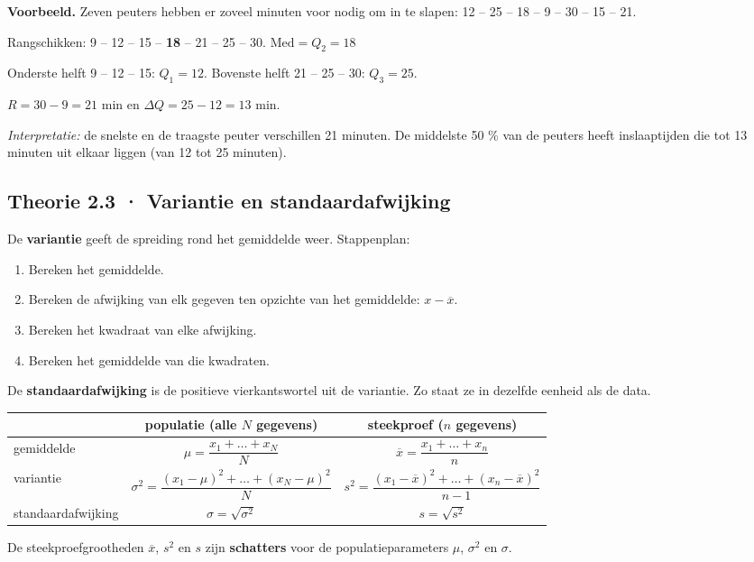 \begin{voorbeeld}
\textbf{Voorbeeld.} Zeven peuters hebben er zoveel minuten voor nodig om in te slapen: 12 – 25 – 18 – 9 – 30 – 15 – 21.

Rangschikken: 9 – 12 – 15 – \textbf{18} – 21 – 25 – 30. \quad $\text{Med}=Q_2=18$

Onderste helft 9 – 12 – 15: $Q_1=12$. \quad Bovenste helft 21 – 25 – 30: $Q_3=25$.

$R=30-9=21$ min \quad en \quad $\Delta Q=25-12=13$ min.

\emph{Interpretatie:} de snelste en de traagste peuter verschillen 21 minuten. De middelste 50 \% van de peuters heeft inslaaptijden die tot 13 minuten uit elkaar liggen (van 12 tot 25 minuten).
\end{voorbeeld}

\subsection*{Theorie 2.3 · Variantie en standaardafwijking}

\begin{theorie}
De \textbf{variantie} geeft de spreiding rond het gemiddelde weer. Stappenplan:

\begin{enumerate}
\item Bereken het gemiddelde.
\item Bereken de afwijking van elk gegeven ten opzichte van het gemiddelde: $x-\overline{x}$.
\item Bereken het kwadraat van elke afwijking.
\item Bereken het gemiddelde van die kwadraten.
\end{enumerate}

De \textbf{standaardafwijking} is de positieve vierkantswortel uit de variantie. Zo staat ze in dezelfde eenheid als de data.

\begin{tabular}{lcc}
\hline
 & populatie (alle $N$ gegevens) & steekproef ($n$ gegevens) \\
\hline
gemiddelde & $\mu=\dfrac{x_1+\dots+x_N}{N}$ & $\overline{x}=\dfrac{x_1+\dots+x_n}{n}$ \\
variantie & $\sigma^2=\dfrac{(x_1-\mu)^2+\dots+(x_N-\mu)^2}{N}$ & $s^2=\dfrac{(x_1-\overline{x})^2+\dots+(x_n-\overline{x})^2}{n-1}$ \\
standaardafwijking & $\sigma=\sqrt{\sigma^2}$ & $s=\sqrt{s^2}$ \\
\hline
\end{tabular}

De steekproefgrootheden $\overline{x}$, $s^2$ en $s$ zijn \textbf{schatters} voor de populatieparameters $\mu$, $\sigma^2$ en $\sigma$.
\end{theorie}

